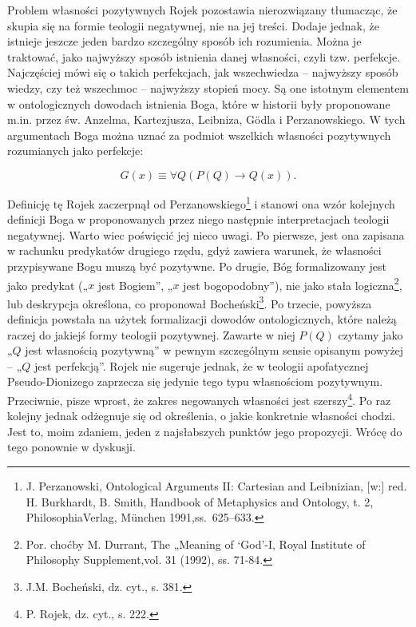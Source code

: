 Problem własności pozytywnych Rojek pozostawia nierozwiązany tłumacząc,
że skupia się na formie teologii negatywnej, nie na jej treści. Dodaje
jednak, że istnieje jeszcze jeden bardzo szczególny sposób ich
rozumienia. Można je traktować, jako najwyższy sposób istnienia danej
własności, czyli tzw. perfekcje. Najczęściej mówi się o takich
perfekcjach, jak wszechwiedza -- najwyższy sposób wiedzy, czy też
wszechmoc -- najwyższy stopień mocy. Są one istotnym elementem w
ontologicznych dowodach istnienia Boga, które w historii były
proponowane m.in. przez św. Anzelma, Kartezjusza, Leibniza, Gödla i
Perzanowskiego. W tych argumentach Boga można uznać za podmiot
wszelkich własności pozytywnych rozumianych jako perfekcje:

\begin{equation}
    G(x) \equiv \forall Q (P(Q) \to Q(x)).
\end{equation}


Definicję tę Rojek zaczerpnął od Perzanowskiego\footnote{J.
Perzanowski, Ontological Arguments II: Cartesian and Leibnizian, [w:]
red. H. Burkhardt, B. Smith, Handbook of Metaphysics and Ontology, t.
2, PhilosophiaVerlag, München 1991,ss.~625–633. } i stanowi ona
wzór kolejnych definicji Boga w proponowanych przez niego następnie
interpretacjach teologii negatywnej. Warto wiec poświęcić jej nieco
uwagi. Po pierwsze, jest ona zapisana w rachunku predykatów drugiego
rzędu, gdyż zawiera warunek, że własności przypisywane Bogu muszą być
pozytywne. Po drugie, Bóg formalizowany jest jako predykat („$x$ jest
Bogiem”, „$x$ jest bogopodobny”), nie jako stała logiczna\footnote{Por.
choćby M. Durrant, The „Meaning of ‘God’-I, Royal Institute of
Philosophy Supplement,vol. 31 (1992), ss. 71-84. }, lub deskrypcja
określona, co proponował Bocheński\footnote{J.M. Bocheński, dz. cyt.,
s. 381. }. Po trzecie, powyższa definicja powstała na użytek
formalizacji dowodów ontologicznych, które należą raczej do jakiejś
formy teologii pozytywnej. Zawarte w niej $P(Q)$ czytamy jako „$Q$ jest
własnością pozytywną” w pewnym szczególnym sensie opisanym powyżej -- „$Q$
jest perfekcją”. Rojek nie sugeruje jednak, że w teologii apofatycznej
Pseudo-Dionizego zaprzecza się jedynie tego typu własnościom
pozytywnym. Przeciwnie, pisze wprost, że zakres negowanych własności
jest szerszy\footnote{P. Rojek, dz. cyt., s. 222. }. Po raz
kolejny jednak odżegnuje się od określenia, o jakie konkretnie
własności chodzi. Jest to, moim zdaniem, jeden z najsłabszych punktów
jego propozycji. Wrócę do tego ponownie w dyskusji.


